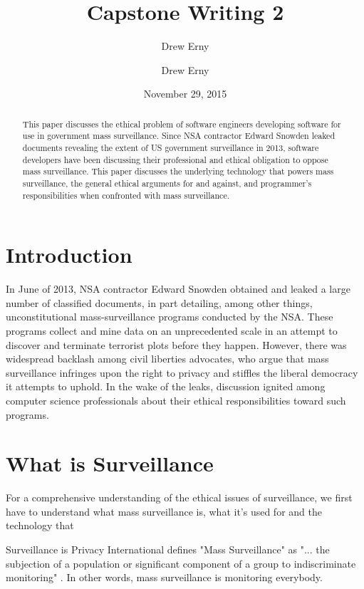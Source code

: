 \documentclass{sig-alternate-05-2015}
\begin{document}
\title{Capstone Writing 2}
\author{Drew Erny}
\date{November 29, 2015}


\author{
  \alignauthor
  Drew Erny
}

\maketitle
\begin{abstract}
This paper discusses the ethical problem of software engineers developing
software for use in government mass surveillance. Since NSA contractor Edward
Snowden leaked documents revealing the extent of US government surveillance in
2013, software developers have been discussing their professional and ethical
obligation to oppose mass surveillance. This paper discusses the underlying
technology that powers mass surveillance, the general ethical arguments for and
against, and programmer's responsibilities when confronted with mass
surveillance.
\end{abstract}

\section{Introduction}
In June of 2013, NSA contractor Edward Snowden obtained and leaked a large
number of classified documents, in part detailing, among other things,
unconstitutional mass-surveillance programs conducted by the NSA. These
programs collect and mine data on an unprecedented scale in an attempt to
discover and terminate terrorist plots before they happen. However, there was
widespread backlash among civil liberties advocates, who argue that mass
surveillance infringes upon the right to privacy and stiffles the liberal
democracy it attempts to uphold. In the wake of the leaks, discussion ignited
among computer science professionals about their ethical responsibilities
toward such programs. 

\section{What is Surveillance}
For a comprehensive understanding of the ethical issues of surveillance, we
first have to understand what mass surveillance is, what it's used for and the
technology that

Surveillance is 
Privacy International defines "Mass Surveillance" as "... the subjection of a
population or significant component of a group to indiscriminate monitoring"
\cite{website:privint}. In other words, mass surveillance is monitoring
everybody.
\end{document}
